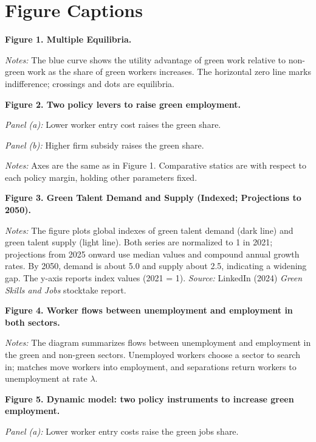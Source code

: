 \documentclass[12pt]{article}
\begin{document}
\section*{Figure Captions}

\noindent\textbf{Figure 1. Multiple Equilibria.}

\noindent\textit{Notes:} The blue curve shows the utility advantage of green work relative to non-green work as the share of green workers increases. The horizontal zero line marks indifference; crossings and dots are equilibria.

\bigskip

\noindent\textbf{Figure 2. Two policy levers to raise green employment.}

\noindent\textit{Panel (a):} Lower worker entry cost raises the green share.  

\noindent\textit{Panel (b):} Higher firm subsidy raises the green share.  

\noindent\textit{Notes:} Axes are the same as in Figure 1. Comparative statics are with respect to each policy margin, holding other parameters fixed.

\bigskip

\noindent\textbf{Figure 3. Green Talent Demand and Supply (Indexed; Projections to 2050).}

\noindent\textit{Notes:} The figure plots global indexes of green talent demand (dark line) and green talent supply (light line). Both series are normalized to 1 in 2021; projections from 2025 onward use median values and compound annual growth rates. By 2050, demand is about 5.0 and supply about 2.5, indicating a widening gap. The y-axis reports index values (2021 = 1). \textit{Source:} LinkedIn (2024) \textit{Green Skills and Jobs} stocktake report.

\bigskip

\noindent\textbf{Figure 4. Worker flows between unemployment and employment in both sectors.}

\noindent\textit{Notes:} The diagram summarizes flows between unemployment and employment in the green and non-green sectors. Unemployed workers choose a sector to search in; matches move workers into employment, and separations return workers to unemployment at rate $\lambda$.

\bigskip

\noindent\textbf{Figure 5. Dynamic model: two policy instruments to increase green employment.}

\noindent\textit{Panel (a):} Lower worker entry costs raise the green jobs share.  
\end{document}
